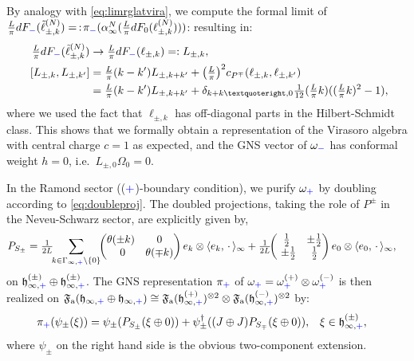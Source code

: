 \documentclass[a4paper, 11pt]{article}
\newcommand{\ua}{\textup a}
\newcommand{\fF}{\mathfrak{F}}\newcommand{\cF}{\mathcal{F}}\newcommand{\dF}{\mathds{F}}\newcommand{\sF}{\mathscr{F}}
\newcommand{\fh}{\mathfrak{h}}
\DeclareMathOperator{\1}{\mathds{1}}
\begin{document}
\medskip

By analogy with \eqref{eq:limrglatvira}, we compute the formal limit of $\tfrac{L}{\pi}dF_{{\color{blue}-}}(\tilde{\ell}^{(N)}_{\pm,k})=\!\ :\!\pi_{{\color{blue}-}}(\alpha^{N}_{\infty}(\tfrac{L}{\pi}dF_{0}(\ell^{(N)}_{\pm,k})))$: resulting in:
\begin{align}
\label{eq:viraCRcxrep}
\tfrac{L}{\pi}dF_{{\color{blue}-}}(\tilde{\ell}^{(N)}_{\pm,k}) & \rightarrow \tfrac{L}{\pi}dF_{{\color{blue}-}}(\ell_{\pm,k}) =: L_{\pm,k}, \\ \nonumber
[L_{\pm,k},L_{\pm,k'}] & = \tfrac{L}{\pi}(k-k')L_{\pm,k+k'} + \big(\tfrac{L}{\pi}\big)^{2}c_{P^{\mp}}(\ell_{\pm,k},\ell_{\pm,k'}) \\ \nonumber
& = \tfrac{L}{\pi}(k-k')L_{\pm,k+k'} + \delta_{k+k’,0}\tfrac{1}{12}(\tfrac{L}{\pi}k)((\tfrac{L}{\pi}k)^2-1),
\end{align}
where we used the fact that $\ell_{\pm,k}$ has off-diagonal parts in the Hilbert-Schmidt class. This shows that we formally obtain a representation of the Virasoro algebra with central charge $c=1$ as expected, and the GNS vector of $\omega_{{\color{blue}-}}$ has conformal weight $h=0$, i.e.~$L_{\pm,0}\Omega_{0} = 0$.

\bigskip

In the Ramond sector ((${\color{blue}+}$)-boundary condition), we purify $\omega_{{\color{blue}+}}$ by doubling according to \eqref{eq:doubleproj}. The doubled projections, taking the role of $P^{\pm}$ in the Neveu-Schwarz sector, are explicitly given by,
\begin{align}
\label{eq:doubleprojR}
P_{S_{\pm}} & = \tfrac{1}{2L}\!\!\sum_{k\in\Gamma_{\infty,{\color{blue}+}}\setminus\{0\}}\!\!\begin{pmatrix} \theta(\pm k) & 0 \\ 0 & \theta(\mp k) \end{pmatrix} e_{k}\otimes \langle e_{k},\!\ \cdot\!\ \rangle_{\infty} + \tfrac{1}{2L}\!\!\begin{pmatrix} \tfrac{1}{2} & \pm\tfrac{1}{2} \\ \pm\tfrac{1}{2} & \tfrac{1}{2} \end{pmatrix} e_{0}\otimes \langle e_{0},\!\ \cdot\!\ \rangle_{\infty},
\end{align}
on $\fh^{(\pm)}_{\infty,{\color{blue}+}}\oplus\fh^{(\pm)}_{\infty,{\color{blue}+}}$. The GNS representation $\pi_{{\color{blue}+}}$ of $\omega_{{\color{blue}+}} = \omega^{(+)}_{{\color{blue}+}}\otimes\omega^{(-)}_{{\color{blue}+}}$ is then realized on $\fF_{\ua}(\fh_{\infty,{\color{blue}+}}\oplus\fh_{\infty,{\color{blue}+}})\cong\fF_{\ua}(\fh^{(+)}_{\infty,{\color{blue}+}})^{\otimes 2}\otimes\fF_{\ua}(\fh^{(-)}_{\infty,{\color{blue}+}})^{\otimes 2}$ by:
\begin{align}
\label{eq:cxrepchiR}
\pi_{{\color{blue}+}}(\psi_{\pm}(\xi)) & = \psi_{\pm}(P_{S_{\pm}}(\xi\oplus0))+\psi^{\dag}_{\pm}((J\oplus J)P_{S_{\mp}}(\xi\oplus0)), & \xi & \in\fh^{(\pm)}_{\infty,{\color{blue}+}},
\end{align}
where $\psi_{\pm}$ on the right hand side is the obvious two-component extension.
\end{document}
